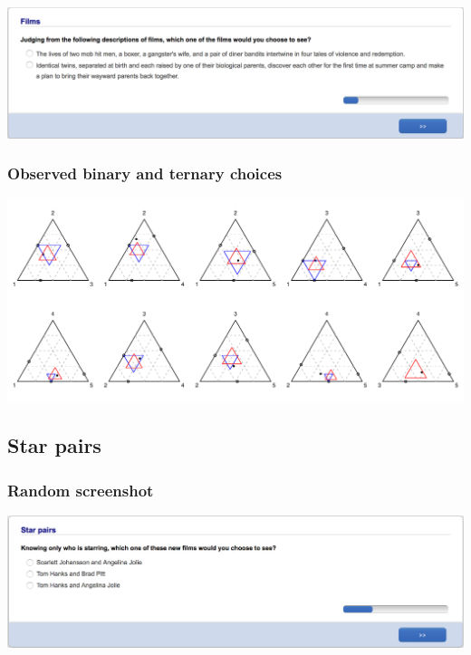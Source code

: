 \documentclass[11pt,letter]{article}
\begin{document}
\includegraphics[width=15cm]{Population_study_design/screenshot_Films.png}

\subsubsection*{Observed binary and ternary choices}

\includegraphics[width=15cm]{./Population_study_data/Simplexes/Films.pdf}

\pagebreak

\subsection*{Star pairs}



\subsubsection*{Random screenshot}

\includegraphics[width=15cm]{Population_study_design/screenshot_Star_Pairs.png}
\end{document}
